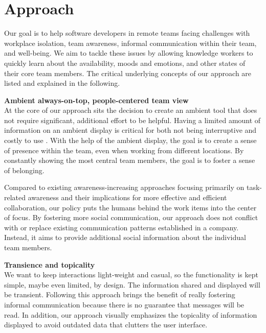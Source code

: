 \chapter{Approach}
\label{chapter:approach}

Our goal is to help software developers in remote teams facing challenges with workplace isolation, team awareness, informal communication within their team, and well-being. We aim to tackle these issues by allowing knowledge workers to quickly learn about the availability, moods and emotions, and other states of their core team members. The critical underlying concepts of our approach are listed and explained in the following.

\medskip\noindent\textbf{Ambient always-on-top, people-centered team view} \\
At the core of our approach sits the decision to create an ambient tool that does not require significant, additional effort to be helpful. Having a limited amount of information on an ambient display is critical for both not being interruptive and costly to use \autocite{dabbish2004controlling}. With the help of the ambient display, the goal is to create a sense of presence within the team, even when working from different locations. By constantly showing the most central team members, the goal is to foster a sense of belonging.

Compared to existing awareness-increasing approaches focusing primarily on task-related awareness and their implications for more effective and efficient collaboration, our policy puts the humans behind the work items into the center of focus. By fostering more social communication, our approach does not conflict with or replace existing communication patterns established in a company. Instead, it aims to provide additional social information about the individual team members.

\medskip\noindent\textbf{Transience and topicality} \\
We want to keep interactions light-weight and casual, so the functionality is kept simple, maybe even limited, by design. The information shared and displayed will be transient. Following this approach brings the benefit of really fostering informal communication because there is no guarantee that messages will be read. In addition, our approach visually emphasizes the topicality of information displayed to avoid outdated data that clutters the user interface.

